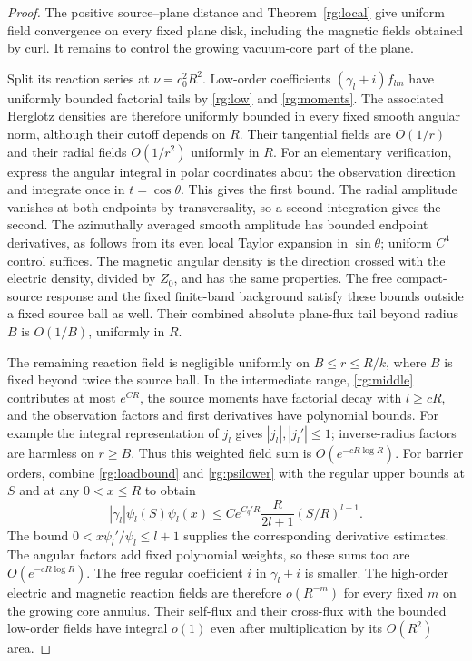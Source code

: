 \begin{proof}
The positive source--plane distance and
Theorem~\ref{rg:local} give uniform field convergence on every
fixed plane disk, including the magnetic fields obtained by
curl. It remains to control the growing vacuum-core part of
the plane.

Split its reaction series at $\nu=c_0^2R^2$. Low-order
coefficients $(\gamma_l+i)f_{lm}$ have uniformly bounded
factorial tails by \eqref{rg:low} and \eqref{rg:moments}.
The associated Herglotz densities are therefore uniformly
bounded in every fixed smooth angular norm, although their
cutoff depends on $R$. Their tangential fields are $O(1/r)$
and their radial fields $O(1/r^2)$ uniformly in $R$.
For an elementary verification, express the angular integral
in polar coordinates about the observation direction and
integrate once in $t=\cos\theta$. This gives the first
bound. The radial amplitude vanishes at both endpoints by
transversality, so a second integration gives the second.
The azimuthally averaged smooth amplitude has bounded
endpoint derivatives, as follows from its even local Taylor
expansion in $\sin\theta$; uniform $C^4$ control suffices.
The magnetic angular density is the direction crossed
with the electric density, divided by $Z_0$, and has the same
properties. The free compact-source response and the fixed
finite-band background satisfy these bounds outside a fixed
source ball as well. Their combined absolute plane-flux tail
beyond radius $B$ is $O(1/B)$, uniformly in $R$.

The remaining reaction field is negligible uniformly on
$B\leq r\leq R/k$, where $B$ is fixed beyond twice the source
ball. In the intermediate range, \eqref{rg:middle} contributes
at most $e^{CR}$, the source moments have factorial decay
with $l\geq cR$, and the observation factors and first
derivatives have polynomial bounds. For example the integral
representation of $j_l$ gives $|j_l|,|j_l'|\leq1$;
inverse-radius factors are harmless on $r\geq B$.
Thus this weighted field sum is $O(e^{-cR\log R})$.
For barrier orders, combine \eqref{rg:loadbound} and
\eqref{rg:psilower} with the regular upper bounds at $S$
and at any $0<x\leq R$ to obtain
\[
 |\gamma_l|\psi_l(S)\psi_l(x)
 \leq C e^{C_q'R}\frac{R}{2l+1}(S/R)^{l+1}.
\]
The bound $0<x\psi_l'/\psi_l\leq l+1$ supplies the
corresponding derivative estimates. The angular factors add
fixed polynomial weights, so these sums too are
$O(e^{-cR\log R})$. The free regular coefficient $i$ in
$\gamma_l+i$ is smaller. The high-order electric and magnetic
reaction fields are therefore $o(R^{-m})$ for every fixed
$m$ on the growing core annulus. Their self-flux and their
cross-flux with the bounded low-order fields have integral
$o(1)$ even after multiplication by its $O(R^2)$ area.


\end{proof}

